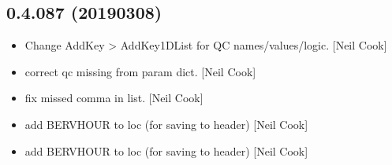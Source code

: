 \documentclass[a4paper,10pt,english]{report}
\begin{document}
\subsection{0.4.087 (2019\sphinxhyphen{}03\sphinxhyphen{}08)}
\label{\detokenize{misc/changelog:id192}}\begin{itemize}
\item {} 
Change AddKey \textendash{}\textgreater{} AddKey1DList for QC names/values/logic. {[}Neil Cook{]}

\item {} 
 \sphinxhyphen{} correct qc missing from param dict. {[}Neil
Cook{]}

\item {} 
 \sphinxhyphen{} fix missed comma in list. {[}Neil Cook{]}

\item {} 
 \sphinxhyphen{} add BERVHOUR to loc (for saving to header) {[}Neil Cook{]}

\item {} 
 \sphinxhyphen{} add BERVHOUR to loc (for saving to header) {[}Neil Cook{]}

\end{itemize}
\end{document}
